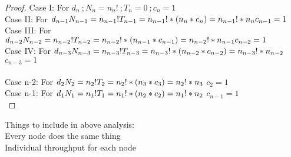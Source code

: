 \begin{proof}

	Case I: For $d_{n}\ ; N_{n} = n_{n}!\ ; T_{n} = 0\ ; c_{n} = 1 $\\
	Case II: For $d_{n - 1}\\ N_{n - 1} = n_{n - 1}!\\ T_{n - 1} = n_{n - 1}! * (n_{n} * c_{n}) = n_{n - 1}! * n_{n}\\ c_{n - 1} = 1\\ $
	Case III: For $d_{n - 2}\\ N_{n - 2} = n_{n - 2}!\\ T_{n -2} = n_{n - 2}! * (n_{n - 1} * c_{n - 1}) = n_{n - 2}! * n_{n - 1 } \\ c_{n - 2} = 1$\\
	Case IV: For $d_{n - 3}\\ N_{n - 3} = n_{n - 3}!\\ T_{n -3} = n_{n - 3}! * (n_{n - 2} * c_{n - 2}) = n_{n - 3}! * n_{n - 2 } \\$     $c_{n - 3} = 1$\\ \\
	Case n-2: For $d_{2}\\ N_{2} = n_{2}!\\ T_{2} = n_{2}! * (n_{3} * c_{3}) = n_{2}! * n_{3} \\$  $c_{2} = 1$\\
	Case n-1: For $d_{1}\\ N_{1} = n_{1}!\\ T_{1} = n_{1}! * (n_{2} * c_{2}) = n_{1}! * n_{2} \\$  $c_{n-1} = 1$\\

\end{proof}


Things to include in above analysis:\\
	Every node does the same thing\\
	Individual throughput for each node\\